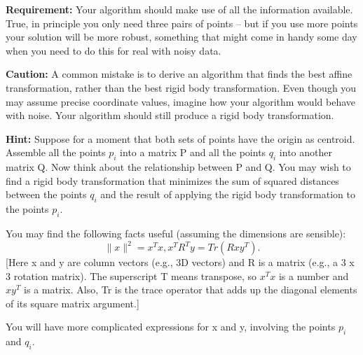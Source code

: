 \documentclass[conference,onecolumn]{IEEEtran}
\begin{document}
\begin{enumerate}[label=\arabic{enumi}.]
          \textbf{Requirement:} Your algorithm should make use of all the information available.
          True, in principle you only need three pairs of points -- but if you use more points your solution will be more robust, something that might come in handy some day when you need to do this for real with noisy data.

          \textbf{Caution:} A common mistake is to derive an algorithm that finds the best affine transformation, rather than the best rigid body transformation.
          Even though you may assume precise coordinate values, imagine how your algorithm would behave with noise.
          Your algorithm should still produce a rigid body transformation.

          \textbf{Hint:} Suppose for a moment that both sets of points have the origin as centroid.
          Assemble all the points {$p_i$} into a matrix P and all the points {$q_i$} into another matrix Q.
          Now think about the relationship between P and Q.
          You may wish to ﬁnd a rigid body transformation that minimizes the sum of squared distances between the points {$q_i$} and the result of applying the rigid body transformation to the points {$p_i$}.

          You may ﬁnd the following facts useful (assuming the dimensions are sensible):
          $$
              \|x\|^2 = x^Tx,
              x^TR^Ty = Tr(Rxy^T).
          $$
          [Here x and y are column vectors (e.g., 3D vectors) and R is a matrix (e.g., a 3 x 3 rotation matrix).
                  The superscript T means transpose, so $x^Tx$ is a number and $xy^T$ is a matrix.
                  Also, Tr is the trace operator that adds up the diagonal elements of its square matrix argument.]

          You will have more complicated expressions for x and y, involving the points {$p_i$} and {$q_i$}.
\end{enumerate}

% 
% 
\end{document}
